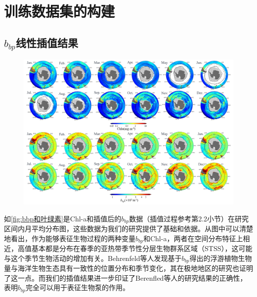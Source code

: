 \section{训练数据集的构建}
\subsection{\texorpdfstring{$b_{bp}$}{}线性插值结果}
\begin{figure}[htbp]
    \centering
    \includegraphics[width=\linewidth]{figure/第三章用图/图3.1.jpg}   
\end{figure}

如\autoref{fig:bbp和叶绿素}是Chl-a和插值后的$b_{bp}$数据（插值过程参考第2.2小节）在研究区间内月平均分布图，这些数据为我们的研究提供了基础和依据。从图中可以清楚地看出，作为能够表征生物过程的两种变量$b_{bp}$和Chl-a，两者在空间分布特征上相近，高值基本都是分布在春季的亚热带季节性分层生物群系区域（STSS），这可能与这个季节生物活动的增加有关。Behrenfeld等人\cite{2013Space}发现基于$b_{bp}$得出的浮游植物生物量与海洋生物生态具有一致性的位置分布和季节变化，其在极地地区的研究也证明了这一点\cite{bbp_Annual_2017}。而我们的插值结果进一步印证了Berenfled等人\cite{2013Space,bbp_Annual_2017}的研究结果的正确性，表明$b_{bp}$完全可以用于表征生物泵的作用。


